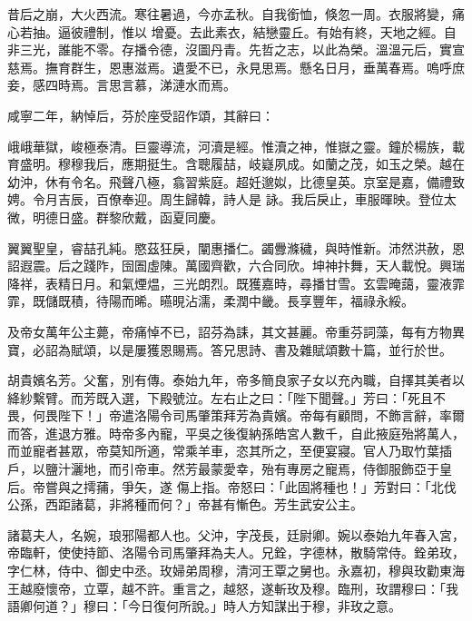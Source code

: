 \begin{pinyinscope}
 昔后之崩，大火西流。寒往暑過，今亦孟秋。自我銜恤，倏忽一周。衣服將變，痛心若抽。逼彼禮制，惟以
 增憂。去此素衣，結戀靈丘。有始有終，天地之經。自非三光，誰能不零。存播令德，沒圖丹青。先哲之志，以此為榮。溫溫元后，實宣慈焉。撫育群生，恩惠滋焉。遺愛不已，永見思焉。懸名日月，垂萬春焉。嗚呼庶妾，感四時焉。言思言慕，涕漣水而焉。



 咸寧二年，納悼后，芬於座受詔作頌，其辭曰：



 峨峨華獄，峻極泰清。巨靈導流，河瀆是經。惟瀆之神，惟嶽之靈。鐘於楊族，載育盛明。穆穆我后，應期挺生。含聰履喆，岐嶷夙成。如蘭之茂，如玉之榮。越在幼沖，休有令名。飛聲八極，翕習紫庭。超妊邈姒，比德皇英。京室是嘉，備禮致娉。令月吉辰，百僚奉迎。周生歸韓，詩人是
 詠。我后戾止，車服暉映。登位太微，明德日盛。群黎欣戴，函夏同慶。



 翼翼聖皇，睿喆孔純。愍茲狂戾，闡惠播仁。蠲釁滌穢，與時惟新。沛然洪赦，恩詔遐震。后之踐阼，囹圄虛陳。萬國齊歡，六合同欣。坤神抃舞，天人載悅。興瑞降祥，表精日月。和氣煙煴，三光朗烈。既獲嘉時，尋播甘雪。玄雲晻藹，靈液霏霏，既儲既積，待陽而晞。曣晛沾濡，柔潤中畿。長享豐年，福祿永綏。



 及帝女萬年公主薨，帝痛悼不已，詔芬為誄，其文甚麗。帝重芬詞藻，每有方物異寶，必詔為賦頌，以是屢獲恩賜焉。答兄思詩、書及雜賦頌數十篇，並行於世。



 胡貴嬪名芳。父奮，別有傳。泰始九年，帝多簡良家子女以充內職，自擇其美者以絳紗繫臂。而芳既入選，下殿號泣。左右止之曰：「陛下聞聲。」芳曰：「死且不畏，何畏陛下！」帝遣洛陽令司馬肇策拜芳為貴嬪。帝每有顧問，不飾言辭，率爾而答，進退方雅。時帝多內寵，平吳之後復納孫皓宮人數千，自此掖庭殆將萬人，而並寵者甚眾，帝莫知所適，常乘羊車，恣其所之，至便宴寢。官人乃取竹葉插戶，以鹽汁灑地，而引帝車。然芳最蒙愛幸，殆有專房之寵焉，侍御服飾亞于皇后。帝嘗與之摴蒱，爭矢，遂
 傷上指。帝怒曰：「此固將種也！」芳對曰：「北伐公孫，西距諸葛，非將種而何？」帝甚有慚色。芳生武安公主。



 諸葛夫人，名婉，琅邪陽都人也。父沖，字茂長，廷尉卿。婉以泰始九年春入宮，帝臨軒，使使持節、洛陽令司馬肇拜為夫人。兄銓，字德林，散騎常侍。銓弟玫，字仁林，侍中、御史中丞。玫婦弟周穆，清河王覃之舅也。永嘉初，穆與玫勸東海王越廢懷帝，立覃，越不許。重言之，越怒，遂斬玫及穆。臨刑，玫謂穆曰：「我語卿何道？」穆曰：「今日復何所說。」時人方知謀出于穆，非玫之意。




\end{pinyinscope}
